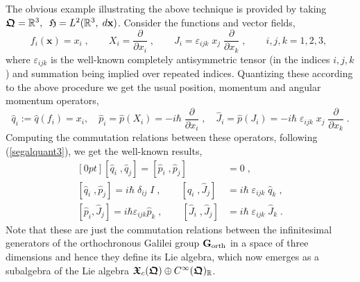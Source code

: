 \documentclass[11pt]{amsart}
\numberwithin{equation}{section}
\theoremstyle{remark}
\newcommand\HH{\mathfrak H}
\newcommand\RR{\mathbb R}
\newcommand{\be}{\begin{equation}}
\newcommand{\en}{\end{equation}}
\newcommand{\bfrakQ}{\mbox{\boldmath $\mathfrak Q$}}
\newcommand{\bfrakX}{\mbox{\boldmath $\mathfrak X$}}
\newcommand{\bx}{\mathbf x}
\newcommand{\CinfRQ}{C^\infty(\bfrakQ)_{\RR}}
\begin{document}
The obvious example illustrating the above technique is provided by
taking  $\bfrakQ = {\mathbb R}^3  , \;\; \HH = L^2 ({\mathbb R}^3 , \; d\bx )$.
Consider the functions and vector fields,
\be
  f_i (\bx ) = x_i\; , \qquad X_i = \frac \partial{\partial x_i} \; , \qquad
  J_i = \varepsilon_{ijk}\; x_j\; \frac \partial{\partial x_k}\;,  \qquad
  i,j,k = 1,2,3, \;
\label{funcandvects}
\en
where $\varepsilon_{ijk}$ is the well-known completely antisymmetric tensor
(in the indices $i,j,k$) and summation being implied over repeated indices.
Quantizing these according to the above procedure we get the usual position,
momentum and angular momentum operators,
\be
  \widehat{q}_i := \widehat{q}(f_i ) = x_i , \quad
  \widehat{p}_i = \widehat{p}(X_i) =
               -i\hbar\; \frac {\partial}{\partial x_i}\;,
   \quad \widehat{J}_i = \widehat{p}(J_i) =
- i\hbar\; \varepsilon_{ijk}\; x_j\; \frac \partial{\partial x_k}\; .
\label{segalquant7}
\en
Computing the commutation relations between these operators, following
(\ref{segalquant3}), we get the well-known results,
\be \begin{aligned}[0pt]
    [\widehat{q}_i \; , \widehat{q}_j ] =  [\widehat{p}_i \; ,
     \widehat{p}_j ] & =  0 \; , \\
[\widehat{q}_i \; , \widehat{p}_j ]  =  i\hbar\; \delta_{ij} \; I\; , \qquad
[\widehat{q}_i \; , \widehat{J}_j ] & =  i\hbar\; \varepsilon_{ijk}\;
\widehat{q}_k \; , \\
[\widehat{p}_i , \widehat{J}_j ] = i\hbar \varepsilon_{ijk}\widehat{p}_k \;
, \qquad [\widehat{J}_i \; , \widehat{J}_j ]& =  i\hbar\; \varepsilon_{ijk}\;
\widehat{J}_k     \; .
\end{aligned} \label{segalquant8} \en
Note that these are just the commutation relations between the infinitesimal
generators of the orthochronous Galilei group ${\mathbf G}_{\rm orth}$
in a space of three dimensions and hence
they define its Lie algebra,
which now emerges as a subalgebra of the Lie algebra
$\bfrakX_c (\bfrakQ )\oplus \CinfRQ$.
\end{document}
